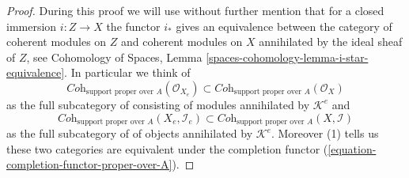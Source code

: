 \begin{proof}
During this proof we will use without further mention that for a closed
immersion $i : Z \to X$ the functor $i_*$ gives an equivalence between the
category of coherent modules on $Z$ and coherent modules on $X$ annihilated
by the ideal sheaf of $Z$, see
Cohomology of Spaces, Lemma \ref{spaces-cohomology-lemma-i-star-equivalence}.
In particular we think of
$$
\textit{Coh}_{\text{support proper over } A}(\mathcal{O}_{X_e})
\subset
\textit{Coh}_{\text{support proper over } A}(\mathcal{O}_X)
$$
as the full subcategory of consisting of modules annihilated by
$\mathcal{K}^e$ and
$$
\textit{Coh}_{\text{support proper over } A}(X_e, \mathcal{I}_e)
\subset
\textit{Coh}_{\text{support proper over } A}(X, \mathcal{I})
$$
as the full subcategory of of objects annihilated by $\mathcal{K}^e$.
Moreover (1) tells us these two categories are equivalent under the
completion functor (\ref{equation-completion-functor-proper-over-A}).


\end{proof}
